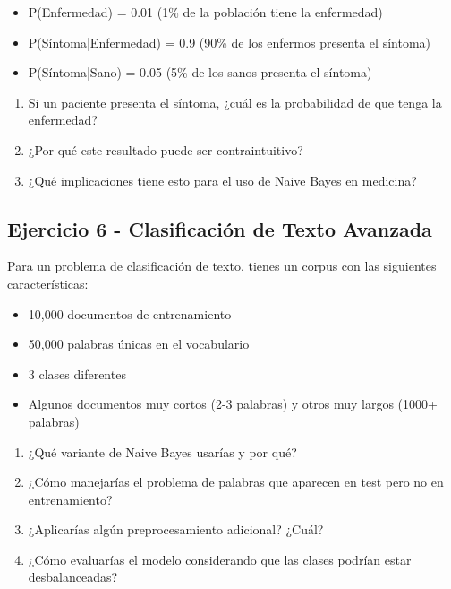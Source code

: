 \documentclass[12pt]{article}
\begin{document}
\begin{itemize}
    \item P(Enfermedad) = 0.01 (1\% de la población tiene la enfermedad)
    \item P(Síntoma|Enfermedad) = 0.9 (90\% de los enfermos presenta el síntoma)
    \item P(Síntoma|Sano) = 0.05 (5\% de los sanos presenta el síntoma)
\end{itemize}

\begin{enumerate}
    \item[a.] Si un paciente presenta el síntoma, ¿cuál es la probabilidad de que tenga la enfermedad?
    \item[b.] ¿Por qué este resultado puede ser contraintuitivo?
    \item[c.] ¿Qué implicaciones tiene esto para el uso de Naive Bayes en medicina?
\end{enumerate}

\subsection{Ejercicio 6 - Clasificación de Texto Avanzada}

Para un problema de clasificación de texto, tienes un corpus con las siguientes características:

\begin{itemize}
    \item 10,000 documentos de entrenamiento
    \item 50,000 palabras únicas en el vocabulario
    \item 3 clases diferentes
    \item Algunos documentos muy cortos (2-3 palabras) y otros muy largos (1000+ palabras)
\end{itemize}

\begin{enumerate}
    \item[a.] ¿Qué variante de Naive Bayes usarías y por qué?
    \item[b.] ¿Cómo manejarías el problema de palabras que aparecen en test pero no en entrenamiento?
    \item[c.] ¿Aplicarías algún preprocesamiento adicional? ¿Cuál?
    \item[d.] ¿Cómo evaluarías el modelo considerando que las clases podrían estar desbalanceadas?
\end{enumerate}

\newpage
\end{document}
